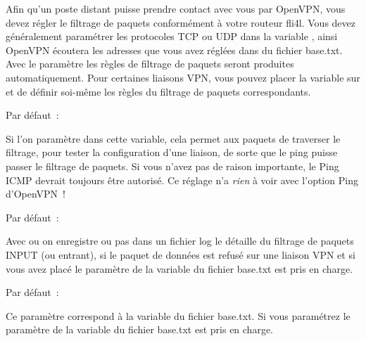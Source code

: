 \begin{description}
  Afin qu'un poste distant puisse prendre contact avec vous par OpenVPN, vous
  devez régler le filtrage de paquets conformément à votre routeur fli4l. Vous
  devez généralement paramétrer les protocoles TCP ou UDP dans la variable
  , ainsi OpenVPN écoutera les adresses que vous avez
  réglées dans  du fichier base.txt.
  Avec le paramètre  les règles de filtrage de paquets seront
  produites automatiquement. Pour certaines liaisons VPN, vous pouvez placer
  la variable sur  et de définir soi-même les règles du filtrage de
  paquets correspondants.


  Par défaut~: 

  Si l'on paramètre  dans cette variable, cela permet aux paquets de
  traverser le filtrage, pour tester la configuration d'une liaison, de sorte
  que le ping puisse passer le filtrage de paquets. Si vous n'avez pas de raison
  importante, le Ping ICMP devrait toujours être autorisé. Ce réglage n'a
  \emph{rien} à voir avec l'option Ping d'OpenVPN~!


  Par défaut~: 

  Avec  ou  on enregistre ou pas dans un fichier log le détaille
  du filtrage de paquets INPUT (ou entrant), si le paquet de données est refusé
  sur une liaison VPN et si vous avez placé  le paramètre de la
  variable  du fichier base.txt est pris en charge.


  Par défaut~: 

  Ce paramètre correspond à la variable 
  du fichier base.txt. Si vous paramétrez  le paramètre de
  la variable  du fichier base.txt est pris en charge.



\end{description}
